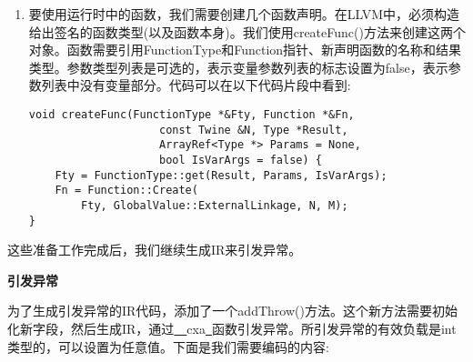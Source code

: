 \begin{enumerate}
\item 要使用运行时中的函数，我们需要创建几个函数声明。在LLVM中，必须构造给出签名的函数类型(以及函数本身)。我们使用createFunc()方法来创建这两个对象。函数需要引用FunctionType和Function指针、新声明函数的名称和结果类型。参数类型列表是可选的，表示变量参数列表的标志设置为false，表示参数列表中没有变量部分。代码可以在以下代码片段中看到:
\begin{lstlisting}[caption={}]
void createFunc(FunctionType *&Fty, Function *&Fn,
					const Twine &N, Type *Result,
					ArrayRef<Type *> Params = None,
					bool IsVarArgs = false) {
	Fty = FunctionType::get(Result, Params, IsVarArgs);
	Fn = Function::Create(
		Fty, GlobalValue::ExternalLinkage, N, M);
}
\end{lstlisting}
\end{enumerate}

这些准备工作完成后，我们继续生成IR来引发异常。\par

\hspace*{\fill} \par %
\textbf{引发异常}

为了生成引发异常的IR代码，添加了一个addThrow()方法。这个新方法需要初始化新字段，然后生成IR，通过\underline{~~}cxa\underline{~}函数引发异常。所引发异常的有效负载是int类型的，可以设置为任意值。下面是我们需要编码的内容:\par

